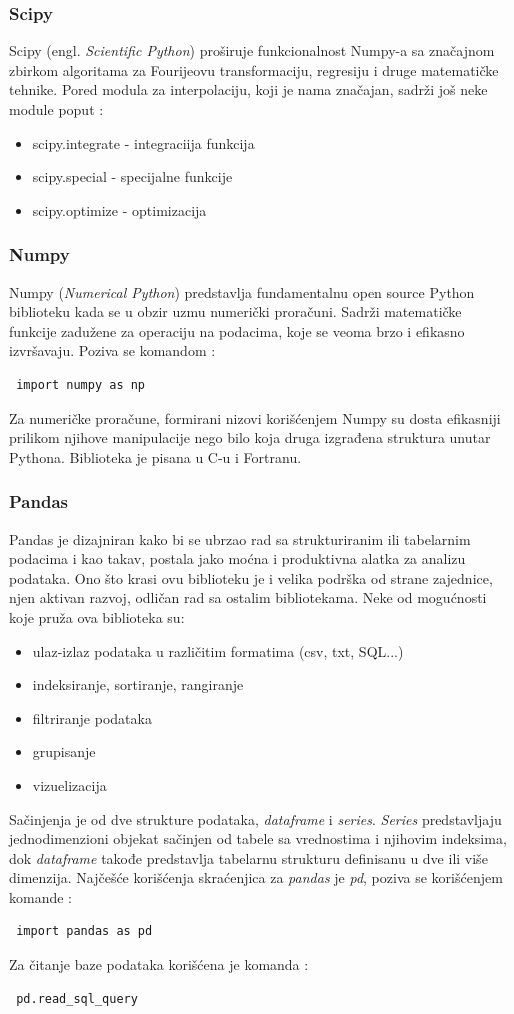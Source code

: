 \documentclass[12pt]{article}
\begin{document}
\subsubsection{Scipy}
Scipy (engl. \textsl{Scientific Python}) proširuje funkcionalnost Numpy-a sa značajnom zbirkom algoritama za Fourijeovu transformaciju, regresiju i druge matematičke tehnike. Pored modula za interpolaciju, koji je nama značajan, sadrži još neke module poput :
\begin{itemize}
\item scipy.integrate - integraciija funkcija
\item scipy.special - specijalne funkcije
\item scipy.optimize - optimizacija
\end{itemize}

\subsubsection{Numpy}
Numpy (\textsl{Numerical Python}) predstavlja fundamentalnu open source Python biblioteku kada se u obzir uzmu numerički proračuni. Sadrži matematičke funkcije zadužene za operaciju na podacima, koje se veoma brzo i efikasno izvršavaju. Poziva se komandom : 
\begin{lstlisting}
 import numpy as np
\end{lstlisting}
Za numeričke proračune, formirani nizovi korišćenjem Numpy su dosta efikasniji prilikom njihove manipulacije nego bilo koja druga izgrađena struktura unutar Pythona. Biblioteka je pisana u C-u i Fortranu. 
\subsubsection{Pandas}
Pandas je dizajniran kako bi se ubrzao rad sa strukturiranim ili tabelarnim podacima i kao takav, postala jako moćna i produktivna alatka za analizu podataka. Ono što krasi ovu biblioteku je i velika podrška od strane zajednice, njen aktivan razvoj, odličan rad sa ostalim bibliotekama. Neke od mogućnosti koje pruža ova biblioteka su:
\begin{itemize}
  \item ulaz-izlaz podataka u različitim formatima (csv, txt, SQL...)
  \item indeksiranje, sortiranje, rangiranje
  \item filtriranje podataka 
  \item grupisanje
  \item vizuelizacija
\end{itemize}
Sačinjenja je od dve strukture podataka, \textsl{dataframe} i \textsl{series}. \textsl{Series} predstavljaju jednodimenzioni objekat sačinjen od tabele sa vrednostima i njihovim indeksima, dok \textsl{dataframe} takođe predstavlja tabelarnu strukturu definisanu u dve ili više dimenzija. Najčešće korišćenja skraćenjica za \textsl{pandas} je \textsl{pd}, poziva se korišćenjem komande :
\begin{lstlisting}
 import pandas as pd 
\end{lstlisting}
Za čitanje baze podataka korišćena je komanda :
\begin{lstlisting}
 pd.read_sql_query
\end{lstlisting}
\end{document}
